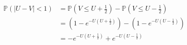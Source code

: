 \documentclass[12pt]{article}
\begin{document}
\newpage
{}

\medskip
{}

\medskip
{}
\begin{align*}
    \mathbb P(|U-V|<1) &= \mathbb P(V \leq U + \frac12) - \mathbb P(V \leq U - \frac12) \\
                       &= (1 - e^{-U(U+\frac12)}) - (1 - e^{-U(U-\frac12)}) \\
                       &= -e^{-U(U+\frac12)} + e^{-U(U-\frac12)}
\end{align*}
\end{document}
